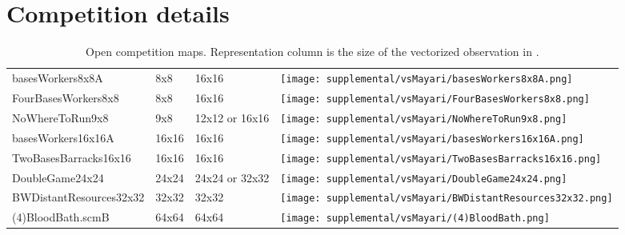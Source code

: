 \documentclass{article}
\begin{document}
\section{Competition details}
\begin{table}[H]
    \centering
    \begin{threeparttable}
        \caption{Open competition maps. Representation column is the size of the vectorized observation in \agentName.}
        \label{tab:open-maps}
            \begin{tabular}{>{\centering\arraybackslash}m{4cm}>{\centering\arraybackslash}m{2cm}>{\centering\arraybackslash}m{2cm}>{\centering\arraybackslash}m{2.25cm}}
                \multicolumn{1}{c}{\bf Name}  &\multicolumn{1}{c}{\bf Size}
                &\multicolumn{1}{c}{\bf Representation}
                &\multicolumn{1}{c}{\bf Start} \\ \hline
                basesWorkers8x8A & 8x8 & 16x16 &
                \texttt{[image: supplemental/vsMayari/basesWorkers8x8A.png]} \\
                FourBasesWorkers8x8 & 8x8 & 16x16 &
                \texttt{[image: supplemental/vsMayari/FourBasesWorkers8x8.png]} \\
                NoWhereToRun9x8 & 9x8 & 12x12\tnote{*} or 16x16\tnote{\P} &
                \texttt{[image: supplemental/vsMayari/NoWhereToRun9x8.png]} \\
                basesWorkers16x16A & 16x16 & 16x16 &
                \texttt{[image: supplemental/vsMayari/basesWorkers16x16A.png]} \\
                TwoBasesBarracks16x16 & 16x16 & 16x16 &
                \texttt{[image: supplemental/vsMayari/TwoBasesBarracks16x16.png]}
                \\
                DoubleGame24x24 & 24x24 & 24x24\tnote{\dag} or 32x32\tnote{\ddag} &
                \texttt{[image: supplemental/vsMayari/DoubleGame24x24.png]} \\
                BWDistantResources32x32 & 32x32 & 32x32 &
                \texttt{[image: supplemental/vsMayari/BWDistantResources32x32.png]}
                \\
                (4)BloodBath.scmB & 64x64 & 64x64 &
                \texttt{[image: supplemental/vsMayari/(4)BloodBath.png]} \\
            \end{tabular}
            \begin{tablenotes}

\end{tablenotes}
\end{threeparttable}
\end{table}
\end{document}
